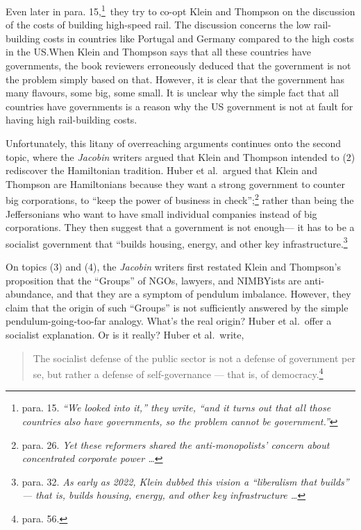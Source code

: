 \documentclass[12pt]{article}
\begin{document}
Even later in para. 15,\footnote{para. 15. \textit{``We looked into it,'' they write, ``and it turns out that all those countries also have governments, so the problem cannot be government.''}}\ they try to co-opt Klein and Thompson on the discussion of the costs of building high-speed rail. The discussion concerns the low rail-building costs in countries like Portugal and Germany compared to the high costs in the US.\@ When Klein and Thompson says that all these countries have governments, the book reviewers erroneously deduced that the government is not the problem simply based on that. However, it is clear that the government has many flavours, some big, some small. It is unclear why the simple fact that all countries have governments is a reason why the US government is not at fault for having high rail-building costs.

Unfortunately, this litany of overreaching arguments continues onto the second topic, where the \textit{Jacobin} writers argued that Klein and Thompson intended to (2) rediscover the Hamiltonian tradition. Huber et al.\ argued that Klein and Thompson are Hamiltonians because they want a strong government to counter big corporations, to ``keep the power of business in check'';\footnote{para. 26. \textit{Yet these reformers shared the anti-monopolists’ concern about concentrated corporate power \dots}} rather than being the Jeffersonians who want to have small individual companies instead of big corporations. They then suggest that a government is not enough--- it has to be a socialist government that ``builds housing, energy, and other key infrastructure.\footnote{para. 32. \textit{As early as 2022, Klein dubbed this vision a “liberalism that builds” — that is, builds housing, energy, and other key infrastructure \dots}}

On topics (3) and (4), the \textit{Jacobin} writers first restated Klein and Thompson's proposition that the ``Groups'' of NGOs, lawyers, and NIMBYists are anti-abundance, and that they are a symptom of pendulum imbalance. However, they claim that the origin of such ``Groups'' is not sufficiently answered by the simple pendulum-going-too-far analogy. What's the real origin? Huber et al.\ offer a socialist explanation. Or is it really? Huber et al.\ write,

\begin{quotation}
	The socialist defense of the public sector is not a defense of government per se, but rather a defense of self-governance — that is, of democracy.\footnote{para. 56.}
\end{quotation}
\end{document}
